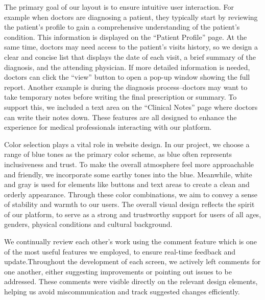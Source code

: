 The primary goal of our layout is to ensure intuitive user interaction. For example when doctors are diagnosing a patient, they typically start by reviewing the patient’s profile to gain a comprehensive understanding of the patient’s condition. This information is displayed on the “Patient Profile” page. At the same time, doctors may need access to the patient’s visits history, so we design a clear and concise list that displays the date of each visit, a brief summary of the diagnosis, and the attending physician. If more detailed information is needed, doctors can click the “view” button to open a pop-up window showing the full report. Another example is during the diagnosis process–doctors may want to take temporary notes before writing the final prescription or summary. To support this, we included a text area on the “Clinical Notes” page where doctors can write their notes down. These features are all designed to enhance the experience for medical professionals interacting with our platform.

Color selection plays a vital role in website design. In our project, we choose a range of blue tones as the primary color scheme, as blue often represents inclusiveness and trust. To make the overall atmosphere feel more approachable and friendly, we incorporate some earthy tones into the blue. Meanwhile, white and gray is used for  elements like buttons and text areas to create a clean and orderly appearance. Through these color combinations, we aim to convey a sense of stability and warmth to our users. The overall visual design reflects the spirit of our platform, to serve as a strong and trustworthy support for users of all ages, genders, physical conditions and cultural background.

We continually review each other’s work using the comment feature which is one of the most useful features we employed, to ensure real-time feedback and update.Throughout the development of each screen, we actively left comments for one another, either suggesting improvements or pointing out issues to be addressed. These comments were visible directly on the relevant design elements, helping us avoid miscommunication and track suggested changes efficiently.


